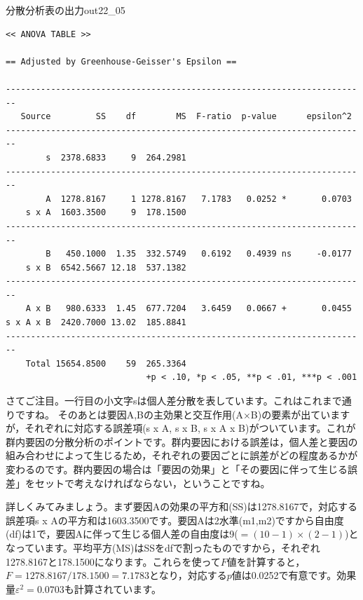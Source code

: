 \documentclass{ltjbook}
\begin{document}
\begin{Rscreen}{分散分析表の出力}{out22_05}
\begin{verbatim}
<< ANOVA TABLE >>

== Adjusted by Greenhouse-Geisser's Epsilon ==

------------------------------------------------------------------------
   Source         SS    df        MS  F-ratio  p-value      epsilon^2 
------------------------------------------------------------------------
        s  2378.6833     9  264.2981                                  
------------------------------------------------------------------------
        A  1278.8167     1 1278.8167   7.1783   0.0252 *       0.0703 
    s x A  1603.3500     9  178.1500                                  
------------------------------------------------------------------------
        B   450.1000  1.35  332.5749   0.6192   0.4939 ns     -0.0177 
    s x B  6542.5667 12.18  537.1382                                  
------------------------------------------------------------------------
    A x B   980.6333  1.45  677.7204   3.6459   0.0667 +       0.0455 
s x A x B  2420.7000 13.02  185.8841                                  
------------------------------------------------------------------------
    Total 15654.8500    59  265.3364                                  
                            +p < .10, *p < .05, **p < .01, ***p < .001

\end{verbatim}
\end{Rscreen}

さてご注目。一行目の小文字sは個人差分散を表しています。これはこれまで通りですね。
そのあとは要因A,Bの主効果と交互作用(A$\times$B)の要素が出ていますが，それぞれに対応する誤差項(s x A, s x B, s x A x B)がついています。これが群内要因の分散分析のポイントです。群内要因における誤差は，個人差と要因の組み合わせによって生じるため，それぞれの要因ごとに誤差がどの程度あるかが変わるのです。群内要因の場合は「要因の効果」と「その要因に伴って生じる誤差」をセットで考えなければならない，ということですね。

詳しくみてみましょう。まず要因Aの効果の平方和(SS)は1278.8167で，対応する誤差項s x Aの平方和は1603.3500です。要因Aは2水準(m1,m2)ですから自由度(df)は1で，要因Aに伴って生じる個人差の自由度は9($=(10-1)\times(2-1)$)となっています。平均平方(MS)はSSをdfで割ったものですから，それぞれ1278.8167と178.1500になります。これらを使って$F$値を計算すると，$F=1278.8167/178.1500=7.1783$となり，対応する$p$値は0.0252で有意です。効果量$\varepsilon^2=0.0703$も計算されています。
\end{document}
